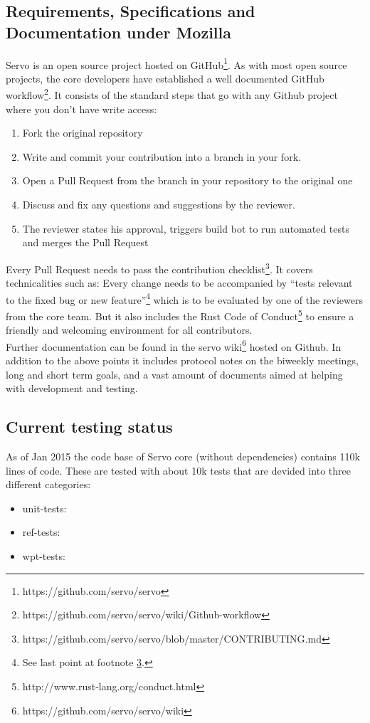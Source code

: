 \documentclass{scrartcl}
\begin{document}
\subsection*{Requirements, Specifications and Documentation under Mozilla}
Servo is an open source project hosted on GitHub\footnote{https://github.com/servo/servo}. As with most open source projects, the core developers have established a well documented GitHub workflow\footnote{https://github.com/servo/servo/wiki/Github-workflow}. It consists of the standard steps that go with any Github project where you don't have write access:
\begin{enumerate}
    \item Fork the original repository
    \item Write and commit your contribution into a branch in your fork.
    \item Open a Pull Request from the branch in your repository to the original one
    \item Discuss and fix any questions and suggestions by the reviewer.
    \item The reviewer states his approval, triggers build bot to run automated tests and merges the Pull Request
\end{enumerate}

Every Pull Request needs to pass the contribution checklist\footnote{\label{contributing}https://github.com/servo/servo/blob/master/CONTRIBUTING.md}. It covers technicalities such as: Every change needs to be accompanied by ``tests relevant to the fixed bug or new feature''\footnote{See last point at footnote \ref{contributing}.} which is to be evaluated by one of the reviewers from the core team. But it also includes the Rust Code of Conduct\footnote{http://www.rust-lang.org/conduct.html} to ensure a friendly and welcoming environment for all contributors.  \\

Further documentation can be found in the servo wiki\footnote{https://github.com/servo/servo/wiki} hosted on Github. In addition to the above points it includes protocol notes on the biweekly meetings, long and short term goals, and a vast amount of documents aimed at helping with development and testing.

\subsection*{Current testing status}

As of Jan 2015 the code base of Servo core (without dependencies) contains 110k lines of code. These are tested with about 10k tests that are devided into three different categories:
\begin{itemize}
    \item unit-tests:
    \item ref-tests:
    \item wpt-tests:
\end{itemize}
\end{document}

